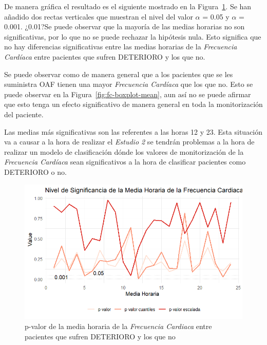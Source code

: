 De manera gráfica el resultado es el siguiente mostrado en la Figura~\ref{fig:mean-FC}. Se han añadido dos rectas verticales que muestran el nivel del valor $\alpha$ = 0.05 y $\alpha$ = 0.001. {\color{blue} ¿0.01?}Se puede observar que la mayoría de las medias horarias no son significativas, por lo que no se puede rechazar la hipótesis nula. Esto significa que no hay diferencias significativas entre las medias horarias de la \textit{Frecuencia Cardíaca} entre pacientes que sufren DETERIORO y los que no.

Se puede observar como de manera general que a los pacientes que se les suministra OAF tienen una mayor \textit{Frecuencia Cardíaca} que los que no. Esto se puede observar en la Figura~\ref{fig:fc-boxplot-mean}, aun así no se puede afirmar que esto tenga un efecto significativo de manera general en toda la monitorización del paciente.

Las medias más significativas son las referentes a las horas 12 y 23. Esta situación va a causar a la hora de realizar el \textit{Estudio 2} se tendrán problemas a la hora de realizar un modelo de clasificación dónde los valores de monitorización de la \textit{Frecuencia Cardíaca} sean significativos a la hora de clasificar pacientes como DETERIORO o no.

\begin{figure}[H]
    \centering
    \includegraphics[scale = 1]{./img/mean-FC.png}
    \caption{p-valor de la media horaria de la \textit{Frecuencia Cardiaca} entre pacientes que sufren DETERIORO y los que no}
    \label{fig:mean-FC}
\end{figure}

